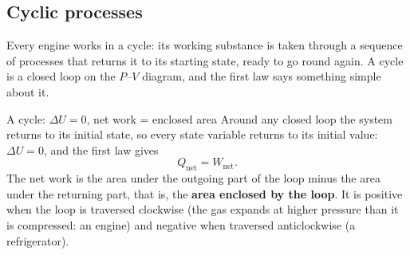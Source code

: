 \subsection{Cyclic processes}\label{sec:cyclic}

Every engine works in a cycle: its working substance is taken through a sequence of processes that
returns it to its starting state, ready to go round again. A cycle is a closed loop on the $P$--$V$
diagram, and the first law says something simple about it.

\begin{keybox}{A cycle: \texorpdfstring{$\Delta U=0$}{Delta U = 0}, net work = enclosed area}\label{key:cycle}
Around any closed loop the system returns to its initial state, so every state variable returns to its
initial value: $\Delta U=0$, and the first law gives
\[ Q_{\text{net}}=W_{\text{net}} . \]
The net work is the area under the outgoing part of the loop minus the area under the returning part,
that is, the \textbf{area enclosed by the loop}. It is positive when the loop is traversed clockwise (the
gas expands at higher pressure than it is compressed: an engine) and negative when traversed
anticlockwise (a refrigerator).
\end{keybox}

\begin{figure}[htbp]
\centering
{}
\end{figure}

